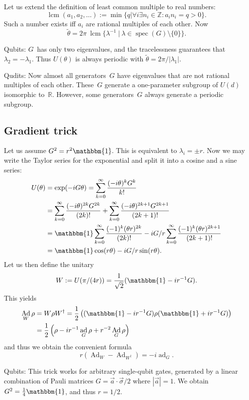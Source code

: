 \documentclass[aps,pra,10pt,twocolumn,groupedaddress,nofootinbib]{revtex4-1}
\theoremstyle{plain}
\DeclareMathOperator{\Ad}{Ad}
\DeclareMathOperator{\ad}{ad}
\DeclareMathOperator{\spec}{spec}  %
\DeclareMathOperator{\lcm}{lcm}    %
\newcommand{\be}{\begin{equation}}
\newcommand{\ee}{\end{equation}}
\newcommand{\Z}{\ensuremath{\mathbb Z}}  %
\newcommand{\R}{\ensuremath{\mathbb R}}  %
\newcommand{\I}{\mathbbm{1}} %
\begin{document}
Let us extend the definition of least common multiple to real numbers:
\be
\lcm(a_1, a_2, \ldots) := \min \{q | \forall i \exists n_i \in \Z: a_i n_i = q>0\}.
\ee
Such a number exists iff $a_i$ are rational multiples of each other.
Now
\be
\tilde{\theta} = 2\pi \: \lcm \{\lambda^{-1} \:|\: \lambda \in \spec(G) \setminus \{0\}\}.
\ee



Qubits:
$G$~has only two eigenvalues, and the tracelessness guarantees that $\lambda_2 = -\lambda_1$.
Thus $U(\theta)$ is always periodic with $\tilde{\theta} = 2\pi/|\lambda_1|$.

Qudits:
Now almost all generators~$G$ have eigenvalues that are not rational multiples of each other.
These~$G$ generate a one-parameter subgroup of $U(d)$ isomorphic to~$\R$.
However, some generators~$G$ always generate a periodic subgroup.


\subsection{Gradient trick}

Let us assume $G^2 = r^2\I$.
This is equivalent to $\lambda_i = \pm r$.
Now we may write the Taylor series for the exponential
and split it into a cosine and a sine series:
\begin{align*}
U(\theta) &= \exp(-iG\theta) = \sum_{k=0}^\infty \frac{(-i\theta)^k G^k}{k!}\\
&=
\sum_{k=0}^\infty \frac{(-i\theta)^{2k} G^{2k}}{(2k)!}
+\sum_{k=0}^\infty \frac{(-i\theta)^{2k+1} G^{2k+1}}{(2k+1)!}\\
&=
\I \sum_{k=0}^\infty \frac{(-1)^{k} (\theta r)^{2k}}{(2k)!}
-i G/r \sum_{k=0}^\infty \frac{(-1)^{k} (\theta r)^{2k+1}}{(2k+1)!}\\
&=
\I \cos(r \theta)
-i G/r \sin(r \theta).
\end{align*}
Let us then define the unitary
\be
W := U(\pi/(4r)) = \frac{1}{\sqrt{2}}(\I -ir^{-1}G).
\ee
This yields
\begin{align}
  \notag
\Ad_W \rho
&= W \rho W^\dagger
= \frac{1}{2}\left((\I-ir^{-1}G)\rho(\I+ir^{-1}G)\right)\\
&= \frac{1}{2}\left(\rho -ir^{-1}\ad_G \rho +r^{-2}\Ad_G \rho\right)
\end{align}
and thus we obtain the convenient formula
\be
r(\Ad_W-\Ad_{W^\dagger}) = -i\ad_G.
\ee


Qubits:
This trick works for arbitrary single-qubit gates, generated by a linear combination of Pauli matrices
$G = \vec{a} \cdot \vec{\sigma}/2$
where $|\vec{a}|=1$.
We obtain $G^2 = \frac{1}{4} \I$, and thus $r=1/2$.
\end{document}
